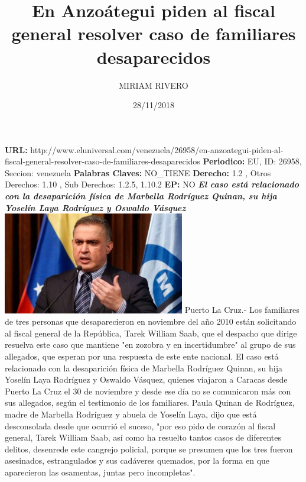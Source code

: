 \documentclass{article}%
\title{\textbf{En Anzoátegui piden al fiscal general resolver caso de familiares desaparecidos}}%
\author{MIRIAM RIVERO}%
\date{28/11/2018}%
\begin{document}
%
\normalsize%
\maketitle%
\textbf{URL: }%
http://www.eluniversal.com/venezuela/26958/en{-}anzoategui{-}piden{-}al{-}fiscal{-}general{-}resolver{-}caso{-}de{-}familiares{-}desaparecidos\newline%
%
\textbf{Periodico: }%
EU, %
ID: %
26958, %
Seccion: %
venezuela\newline%
%
\textbf{Palabras Claves: }%
NO\_TIENE\newline%
%
\textbf{Derecho: }%
1.2%
, Otros Derechos: %
1.10%
, Sub Derechos: %
1.2.5, 1.10.2%
\newline%
%
\textbf{EP: }%
NO\newline%
\newline%
%
\textbf{\textit{El caso está relacionado con la desaparición física de Marbella Rodríguez Quinan, su hija Yoselín Laya Rodríguez y Oswaldo Vásquez}}%
\newline%
\newline%
%
\includegraphics[width=300px]{234.jpg}%
\newline%
%
Puerto La Cruz.{-} Los familiares de tres personas que desaparecieron en noviembre del año 2010 están solicitando al fiscal general de la República, Tarek William Saab, que el despacho que dirige resuelva este caso que mantiene "en zozobra y en incertidumbre" al grupo de sus allegados, que esperan por una respuesta de este ente nacional.%
\newline%
%
El caso está relacionado con la desaparición física de Marbella Rodríguez Quinan, su hija Yoselín Laya Rodríguez y Oswaldo Vásquez, quienes viajaron a Caracas desde Puerto La Cruz el 30 de noviembre y desde ese día no se comunicaron más con sus allegados, según el testimonio de los familiares.%
\newline%
%
Paula Quinan de Rodríguez,  madre de Marbella Rodríguez y abuela de Yoselín Laya, dijo que está desconsolada desde que ocurrió el suceso, "por eso pido de corazón al fiscal general, Tarek William Saab, así como ha resuelto tantos casos de diferentes delitos, desenrede este cangrejo policial, porque se presumen que los tres fueron asesinados, estrangulados y sus cadáveres quemados, por la forma en que aparecieron las osamentas, juntas pero incompletas".%
\end{document}
